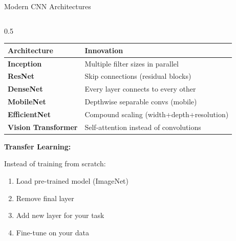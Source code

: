 \begin{frame}{Modern CNN Architectures}
\begin{columns}
\begin{column}{0.5\textwidth}
\begin{table}
\tiny
\begin{tabular}{|l|p{4.5cm}|}
\hline
\rowcolor{navyblue!20}
\textbf{Architecture} & \textbf{Innovation} \\
\hline
\textbf{Inception} & Multiple filter sizes in parallel \\
\hline
\textbf{ResNet} & Skip connections (residual blocks) \\
\hline
\textbf{DenseNet} & Every layer connects to every other \\
\hline
\textbf{MobileNet} & Depthwise separable convs (mobile) \\
\hline
\textbf{EfficientNet} & Compound scaling (width+depth+resolution) \\
\hline
\textbf{Vision Transformer} & Self-attention instead of convolutions \\
\hline
\end{tabular}
\end{table}

\vspace{0.3cm}

\textbf{Transfer Learning:}

Instead of training from scratch:
\begin{enumerate}
\item Load pre-trained model (ImageNet)
\item Remove final layer
\item Add new layer for your task
\item Fine-tune on your data
\end{enumerate}
\end{column}
\end{columns}
\end{frame}


